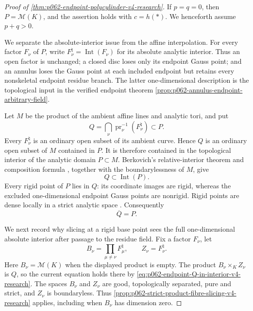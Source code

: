 \begin{proof}[Proof of \cref{thm:p062-endpoint-polycylinder-v4-research}]
If \(p=q=0\), then \(P=\mathcal M(K)\), and the assertion holds with
\(c=h(*)\).  We henceforth assume \(p+q>0\).

We separate the absolute-interior issue from the affine interpolation.  For
every factor \(F_\nu\) of \(P\), write
\(
 F_\nu^\natural=\operatorname{Int}(F_\nu)
\)
for its absolute analytic interior.  Thus an open factor is unchanged; a
closed disc loses only its endpoint Gauss point; and an annulus loses the
Gauss point at each included endpoint but retains every nonskeletal
endpoint residue branch.  The latter one-dimensional description is the
topological input in the verified endpoint theorem
\cref{prop:p062-annulus-endpoint-arbitrary-field}.

Let \(M\) be the product of the ambient affine lines and analytic tori, and
put
\begin{equation}\label{eq:p062-endpoint-coordinate-interior-v4-research}
 Q=\bigcap_\nu\operatorname{pr}_\nu^{-1}(F_\nu^\natural)\subset P.
\end{equation}
Every \(F_\nu^\natural\) is an ordinary open subset of its ambient curve.
Hence \(Q\) is an ordinary open subset of \(M\) contained in \(P\).  It is
therefore contained in the topological interior of the analytic domain
\(P\subset M\).  Berkovich's relative-interior theorem and composition
formula \cite[Proposition~1.5.5(i)--(ii)]{Berk93}, together with the
boundarylessness of \(M\), give
\begin{equation}\label{eq:p062-endpoint-Q-in-interior-v4-research}
                              Q\subset\operatorname{Int}(P).
\end{equation}
Every rigid point of \(P\) lies in \(Q\): its coordinate images are rigid,
whereas the excluded one-dimensional endpoint Gauss points are nonrigid.
Rigid points are dense locally in a strict analytic space
\cite[Proposition~2.1.15]{Berk12}.  Consequently
\begin{equation}\label{eq:p062-endpoint-Q-dense-v4-research}
                              \overline Q=P.
\end{equation}

We next record why slicing at a rigid base point sees the full
one-dimensional absolute interior after passage to the residue field.  Fix
a factor \(F_\nu\), let
\[
 B_\nu=\prod_{\mu\ne\nu}F_\mu^\natural,
 \qquad Z_\nu=F_\nu^\natural.
\]
Here \(B_\nu=\mathcal M(K)\) when the displayed product is empty.  The
product \(B_\nu\times_KZ_\nu\) is \(Q\), so the current equation holds
there by \eqref{eq:p062-endpoint-Q-in-interior-v4-research}.  The spaces
\(B_\nu\) and \(Z_\nu\) are good, topologically separated, pure and strict,
and \(Z_\nu\) is boundaryless.  Thus
\cref{prop:p062-strict-product-fibre-slicing-v4-research} applies, including
when \(B_\nu\) has dimension zero.


\end{proof}
